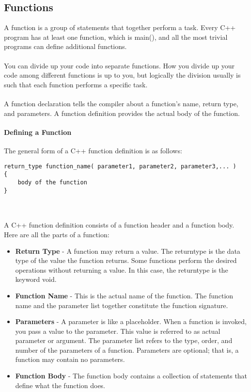 \documentclass[11pt,fleqn]{book} %
\begin{document}
\subsection{Functions}
A function is a group of statements that together perform a task. Every C++ program has at least one function, which is main(), and all the most trivial programs can define additional functions.\\ ~\\ 
You can divide up your code into separate functions. How you divide up your code among different functions is up to you, but logically the division usually is such that each function performs a specific task. ~\\ ~\\
A function declaration tells the compiler about a function's name, return type, and parameters. A function definition provides the actual body of the function.
\paragraph{Defining a Function}
The general form of a C++ function definition is as follows:
\begin{lstlisting}
return_type function_name( parameter1, parameter2, parameter3,... ) 
{
	body of the function
}
\end{lstlisting} ~\\ ~\\
A C++ function definition consists of a function header and a function body. Here are all the parts of a function: ~\\
\begin{itemize}
\item \textbf{Return Type} - A function may return a value. The return\textunderscore type is the data type of the value the function returns. Some functions perform the desired operations without returning a value. In this case, the return\textunderscore type is the keyword void. \\
\item \textbf{Function Name} - This is the actual name of the function. The function name and the parameter list together constitute the function signature.\\
\item \textbf{Parameters} - A parameter is like a placeholder. When a function is invoked, you pass a value to the parameter. This value is referred to as actual parameter or argument. The parameter list refers to the type, order, and number of the parameters of a function. Parameters are optional; that is, a function may contain no parameters.\\
\item \textbf{Function Body} - The function body contains a collection of statements that define what the function does. ~\\
\end{itemize}
\end{document}
